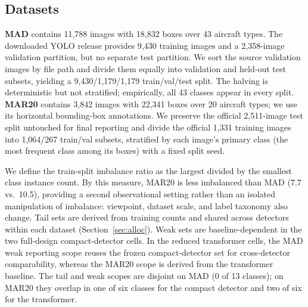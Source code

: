 \documentclass[preprint,12pt,authoryear]{elsarticle}
\begin{document}
\subsection{Datasets}
\textbf{MAD} \citep[Military Aircraft Detection, natural side/ground
views; public;][]{rookieengg2023mad} contains 11{,}788 images with
18{,}832 boxes over 43 aircraft types. The downloaded YOLO release
provides 9{,}430 training images and a 2{,}358-image validation
partition, but no separate test partition. We sort the source validation
images by file path and divide them equally into validation and held-out
test subsets, yielding a 9{,}430/1{,}179/1{,}179 train/val/test
split. The halving is deterministic but not stratified; empirically,
all 43 classes appear in every split.
\textbf{MAR20} \citep[Military Aircraft Recognition dataset, satellite
view; public;][]{yu2023mar20} contains 3{,}842 images with 22{,}341 boxes
over 20 aircraft types; we use its horizontal bounding-box annotations.
We preserve the official 2{,}511-image test split untouched for final
reporting and divide the official 1{,}331 training images into
1{,}064/267 train/val subsets, stratified by each image's primary
class (the most frequent class among its boxes) with a fixed split
seed.

We define the train-split imbalance ratio as the largest divided by the
smallest class instance count. By this measure, MAR20 is less imbalanced
than MAD (7.7 vs.\ 10.5), providing a second observational setting rather
than an isolated manipulation of imbalance: viewpoint, dataset scale,
and label taxonomy also change. Tail sets are derived from training
counts and shared across detectors within each dataset
(Section~\ref{sec:alloc}). Weak sets are baseline-dependent in the two
full-design compact-detector cells. In the reduced transformer cells,
the MAD weak reporting scope reuses the frozen compact-detector set for
cross-detector comparability, whereas the MAR20 scope is derived from
the transformer baseline. The tail and weak scopes are disjoint on MAD
(0 of 13 classes); on MAR20 they overlap in one of six classes for the
compact detector and two of six for the transformer.
\end{document}
